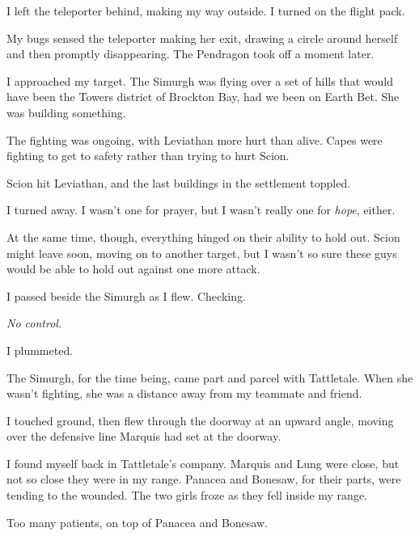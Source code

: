 I left the teleporter behind, making my way outside.  I turned on the flight pack.



My bugs sensed the teleporter making her exit, drawing a circle around herself and then promptly disappearing.  The Pendragon took off a moment later.



I approached my target.  The Simurgh was flying over a set of hills that would have been the Towers district of Brockton Bay, had we been on Earth Bet.  She was building something.



The fighting was ongoing, with Leviathan more hurt than alive.  Capes were fighting to get to safety rather than trying to hurt Scion.



Scion hit Leviathan, and the last buildings in the settlement toppled.



I turned away.  I wasn't one for prayer, but I wasn't really one for \emph{hope}, either.



At the same time, though, everything hinged on their ability to hold out.  Scion might leave soon, moving on to another target, but I wasn't so sure these guys would be able to hold out against one more attack.



I passed beside the Simurgh as I flew.  Checking.



\emph{No control.}



I plummeted.



The Simurgh, for the time being, came part and parcel with Tattletale.  When she wasn't fighting, she was a distance away from my teammate and friend.



I touched ground, then flew through the doorway at an upward angle, moving over the defensive line Marquis had set at the doorway.



I found myself back in Tattletale's company.  Marquis and Lung were close, but not so close they were in my range.  Panacea and Bonesaw, for their parts, were tending to the wounded.  The two girls froze as they fell inside my range.



Too many patients, on top of Panacea and Bonesaw.



